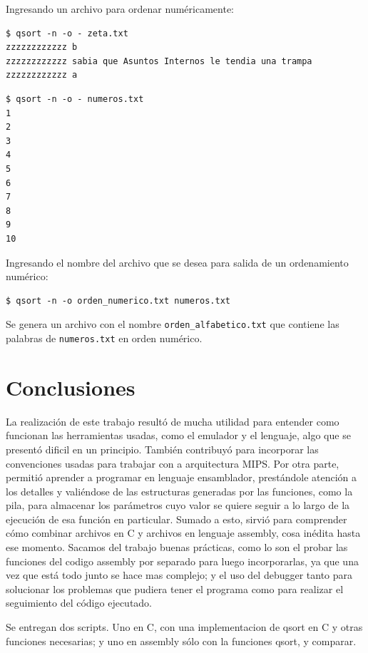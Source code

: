 \documentclass[a4paper, 12pt]{article}
\begin{document}
	\vspace*{12pt}
	Ingresando un archivo para ordenar numéricamente:
	\begin{verbatim}
$ qsort -n -o - zeta.txt
zzzzzzzzzzzz b
zzzzzzzzzzzz sabia que Asuntos Internos le tendia una trampa
zzzzzzzzzzzz a
	\end{verbatim}
	
	\begin{verbatim}
$ qsort -n -o - numeros.txt
1
2
3
4
5
6
7
8
9
10
	\end{verbatim}
	
	Ingresando el nombre del archivo que se desea para salida de un ordenamiento numérico:
	\begin{verbatim}
$ qsort -n -o orden_numerico.txt numeros.txt
	\end{verbatim}
	Se genera un archivo con el nombre \texttt{orden\_alfabetico.txt} que contiene las palabras de \texttt{numeros.txt} en orden numérico.
	
	\section{Conclusiones}
	
	La realización de este trabajo resultó de mucha utilidad para entender como funcionan las herramientas usadas, como el emulador y el lenguaje, algo que se presentó dificil en un principio. También contribuyó para incorporar las convenciones usadas para trabajar con a arquitectura MIPS.
	Por otra parte, permitió aprender a programar en lenguaje ensamblador, prestándole atención a los detalles y valiéndose de las estructuras generadas por las funciones, como la pila, para almacenar los parámetros cuyo valor se quiere seguir a lo largo de la ejecución de esa función en particular. Sumado a esto, sirvió para comprender cómo combinar archivos en C y archivos en lenguaje assembly, cosa inédita hasta ese momento.
	Sacamos del trabajo buenas prácticas, como lo son el probar las funciones del codigo assembly por separado para luego incorporarlas, ya que una vez que está todo junto se hace mas complejo; y el uso del debugger tanto para solucionar los problemas que pudiera tener el programa como para realizar el seguimiento del código ejecutado.
	
	Se entregan dos scripts. Uno en C, con una implementacion de qsort en C y otras funciones necesarias; y uno en assembly sólo con la funciones qsort, y comparar.
\end{document}
